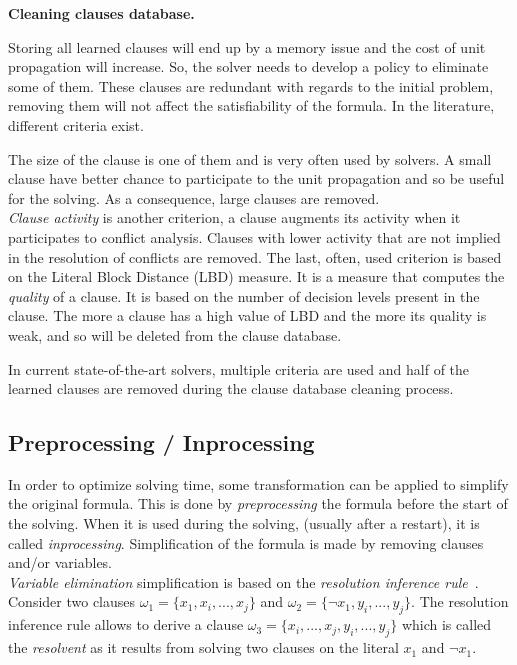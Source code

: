 \textbf{Cleaning clauses database.}

Storing  all learned clauses will end up by a memory issue and the cost of unit propagation will increase.
 So, the solver needs to develop a policy to eliminate some of them. These clauses are redundant with regards to the initial 
 problem, removing them will not affect the satisfiability of the formula.
  In the literature, different criteria exist.
  
 The size of the clause is one of them and is very often used by solvers. 
 A small clause have better chance to participate to the unit propagation and so be useful for the solving.
 As a consequence, large clauses are removed.\\
\emph{Clause activity} is another criterion, a clause augments its activity when it participates to conflict analysis. 
Clauses with lower activity that are not implied in the resolution of conflicts are removed.
 The last, often, used criterion is based on the Literal Block Distance (LBD) measure. It is a measure that computes the \emph{quality} of a clause.
It is based on the number of decision levels present in the clause. The more a clause has a high value of LBD and the more its quality is weak, 
and so will be deleted from the clause database.
 
In current state-of-the-art solvers, multiple criteria are used and half of the learned clauses are removed during the clause database cleaning process.
\subsection{Preprocessing / Inprocessing}
In order to optimize solving time, some transformation can be applied to simplify the original formula.
This is done by \emph{preprocessing} the formula before the start of the solving.
When it is used during the solving, (usually after a restart), it is called \emph{inprocessing}.
Simplification of the formula is made by removing clauses and/or variables.\\

\emph{Variable elimination} simplification is based on the \emph{resolution inference rule}~\cite{robinson1965machine}.
Consider two clauses $\omega_1 = \{x_1, x_i, ..., x_j \}$ and $\omega_2 = \{\neg x_1, y_i, ..., y_j\}$.
The resolution inference rule allows to derive a clause $\omega_3 = \{x_i, ..., x_j, y_i, ..., y_j\}$ which is called
the \emph{resolvent} as it results from solving two clauses on the literal $x_1$ and $\neg x_1$.

